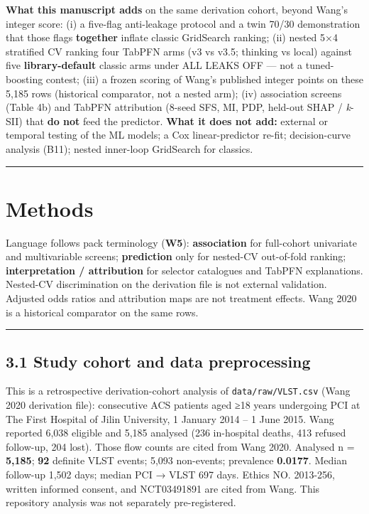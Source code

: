 \documentclass[
]{article}
\begin{document}
\textbf{What this manuscript adds} on the same derivation cohort, beyond
Wang's integer score: (i) a five-flag anti-leakage protocol and a twin
70/30 demonstration that those flags \textbf{together} inflate classic
GridSearch ranking; (ii) nested 5×4 stratified CV ranking four TabPFN
arms (v3 vs v3.5; thinking vs local) against five
\textbf{library-default} classic arms under ALL LEAKS OFF --- not a
tuned-boosting contest; (iii) a frozen scoring of Wang's published
integer points on these 5,185 rows (historical comparator, not a nested
arm); (iv) association screens (Table 4b) and TabPFN attribution (8-seed
SFS, MI, PDP, held-out SHAP / \emph{k}-SII) that \textbf{do not} feed
the predictor. \textbf{What it does not add:} external or temporal
testing of the ML models; a Cox linear-predictor re-fit; decision-curve
analysis (B11); nested inner-loop GridSearch for classics.

\begin{center}\rule{0.5\linewidth}{0.5pt}\end{center}

\section{Methods}\label{methods-1}

Language follows pack terminology (\textbf{W5}): \textbf{association}
for full-cohort univariate and multivariable screens;
\textbf{prediction} only for nested-CV out-of-fold ranking;
\textbf{interpretation / attribution} for selector catalogues and TabPFN
explanations. Nested-CV discrimination on the derivation file is not
external validation. Adjusted odds ratios and attribution maps are not
treatment effects. Wang 2020 is a historical comparator on the same
rows.

\begin{center}\rule{0.5\linewidth}{0.5pt}\end{center}

\subsection{3.1 Study cohort and data
preprocessing}\label{study-cohort-and-data-preprocessing}

This is a retrospective derivation-cohort analysis of
\texttt{data/raw/VLST.csv} (Wang 2020 derivation file): consecutive ACS
patients aged ≥18 years undergoing PCI at The First Hospital of Jilin
University, 1 January 2014 -- 1 June 2015. Wang reported 6,038 eligible
and 5,185 analysed (236 in-hospital deaths, 413 refused follow-up, 204
lost). Those flow counts are cited from Wang 2020. Analysed n =
\textbf{5,185}; \textbf{92} definite VLST events; 5,093 non-events;
prevalence \textbf{0.0177}. Median follow-up 1,502 days; median PCI →
VLST 697 days. Ethics NO. 2013-256, written informed consent, and
NCT03491891 are cited from Wang. This repository analysis was not
separately pre-registered.
\end{document}

